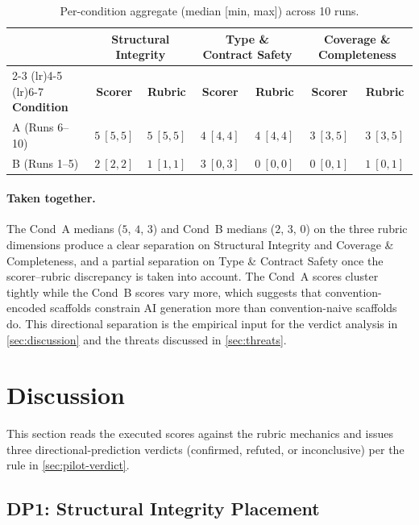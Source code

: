 \documentclass[12pt,a4paper]{report}
\begin{document}
\begin{table}[H]
\centering
\caption{Per-condition aggregate (median [min, max]) across 10 runs.}
\label{tbl:pilot-aggregate}
\small
\begin{tabular}{@{}l cc cc cc@{}}
\toprule
& \multicolumn{2}{c}{\textbf{Structural Integrity}} & \multicolumn{2}{c}{\textbf{Type \& Contract Safety}} & \multicolumn{2}{c}{\textbf{Coverage \& Completeness}} \\
\cmidrule(lr){2-3} \cmidrule(lr){4-5} \cmidrule(lr){6-7}
\textbf{Condition} & \textbf{Scorer} & \textbf{Rubric} & \textbf{Scorer} & \textbf{Rubric} & \textbf{Scorer} & \textbf{Rubric} \\
\midrule
A (Runs 6--10)  & $5\ [5, 5]$ & $5\ [5, 5]$ & $4\ [4, 4]$ & $4\ [4, 4]$ & $3\ [3, 5]$ & $3\ [3, 5]$ \\
B (Runs 1--5)   & $2\ [2, 2]$ & $1\ [1, 1]$ & $3\ [0, 3]$ & $0\ [0, 0]$ & $0\ [0, 1]$ & $1\ [0, 1]$ \\
\bottomrule
\end{tabular}
\normalsize
\end{table}


\paragraph{Taken together.}
The Cond~A medians ($5$, $4$, $3$) and Cond~B medians ($2$, $3$, $0$) on the three rubric dimensions produce a clear separation on Structural Integrity and Coverage \& Completeness, and a partial separation on Type \& Contract Safety once the scorer--rubric discrepancy is taken into account. The Cond~A scores cluster tightly while the Cond~B scores vary more, which suggests that convention-encoded scaffolds constrain AI generation more than convention-naive scaffolds do. This directional separation is the empirical input for the verdict analysis in \autoref{sec:discussion} and the threats discussed in \autoref{sec:threats}.

\section{Discussion}
\label{sec:discussion}

This section reads the executed scores against the rubric mechanics and issues three directional-prediction verdicts (confirmed, refuted, or inconclusive) per the rule in \autoref{sec:pilot-verdict}.

\subsection{DP1: Structural Integrity Placement}
\label{sec:dp1-results}
\end{document}
